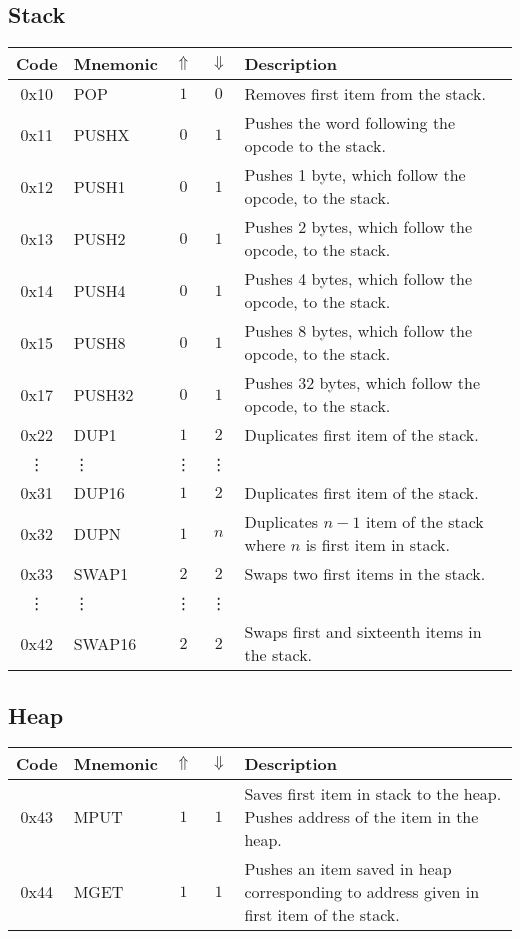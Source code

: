 \documentclass[12pt,a4paper]{article}
\begin{document}
\subsection{Stack}
\begin{tabularx}{\textwidth}{ c l c c p{7cm} }
\textbf{Code} & \textbf{Mnemonic} & \textbf{$\Uparrow$} & \textbf{$\Downarrow$} & \textbf{Description} \\
\hline
0x10 & POP & $1$ & $0$ & Removes first item from the stack. \\
\hline
0x11 & PUSHX & $0$ & $1$ & Pushes the word following the opcode to the stack. \\
\hline
0x12 & PUSH1 & $0$ & $1$ & Pushes 1 byte, which follow the opcode, to the stack. \\
\hline
0x13 & PUSH2 & $0$ & $1$ & Pushes 2 bytes, which follow the opcode, to the stack. \\
\hline
0x14 & PUSH4 & $0$ & $1$ & Pushes 4 bytes, which follow the opcode, to the stack. \\
\hline
0x15 & PUSH8 & $0$ & $1$ & Pushes 8 bytes, which follow the opcode, to the stack. \\
\hline
0x17 & PUSH32 & $0$ & $1$ & Pushes 32 bytes, which follow the opcode, to the stack. \\
\hline
0x22 & DUP1 & $1$ & $2$ & Duplicates first item of the stack. \\
\vdots & \vdots & \vdots & \vdots \\
0x31 & DUP16 & $1$ & $2$ & Duplicates first item of the stack. \\
\hline
0x32 & DUPN & $1$ & $n$ & Duplicates $n-1$ item of the stack where $n$ is first item in stack. \\
\hline
0x33 & SWAP1 & $2$ & $2$ & Swaps two first items in the stack. \\
\vdots & \vdots & \vdots & \vdots \\
0x42 & SWAP16 & $2$ & $2$ & Swaps first and sixteenth items in the stack. \\
\hline
\end{tabularx}

\subsection{Heap}
\begin{tabularx}{\textwidth}{ c l c c p{7cm} }
\textbf{Code} & \textbf{Mnemonic} & \textbf{$\Uparrow$} & \textbf{$\Downarrow$} & \textbf{Description} \\
\hline
0x43 & MPUT & $1$ & $1$ & Saves first item in stack to the heap. Pushes address of the item in the heap. \\
\hline
0x44 & MGET & $1$ & $1$ & Pushes an item saved in heap corresponding to address given in first item of the stack.  \\
\hline
\end{tabularx}
\end{document}

